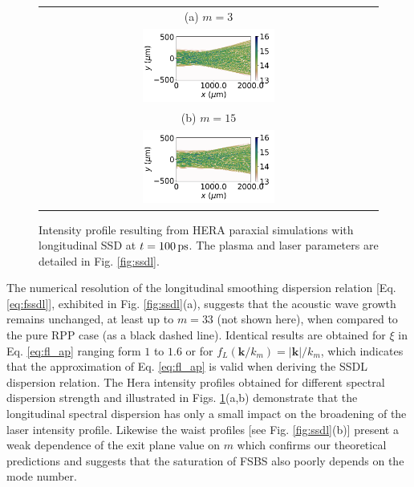 \documentclass[
 reprint,
 amsmath,amssymb,
 aps,
]{revtex4-1}
\begin{document}
\begin{figure}
\begin{tabular}{c}
(a)  $m=3$\\
\includegraphics[width=0.4\textwidth,trim={2cm 0 0 0},clip]{ISSD1.png}\\
(b) $m=15$\\
\includegraphics[width=0.4\textwidth,trim={2cm 0 0 0},clip]{ISSDL5.png}
\end{tabular}
\caption{ \label{fig:ssdl_I} 
  Intensity profile resulting from HERA  paraxial simulations  with longitudinal SSD at $t=100\,\rm ps$. The plasma and laser parameters are detailed in Fig. \ref{fig:ssdl}.
}
\end{figure}
The numerical resolution of the  longitudinal smoothing dispersion relation [Eq. \eqref{eq:fssdl}], exhibited in Fig. \ref{fig:ssdl}(a), suggests that the acoustic wave  growth remains unchanged, at least up to  $m=33$ (not shown here),  when compared to the pure RPP case (as a black dashed line). Identical results are obtained for $\xi$ in Eq. \eqref{eq:fl_ap} ranging form $1$ to $1.6$ or for  $f_L(\mathbf{k}/k_m) = \vert \mathbf{k}\vert /k_m$, which indicates that the approximation of Eq.  \eqref{eq:fl_ap} is valid  when deriving the SSDL dispersion relation.
The Hera intensity profiles obtained for different spectral dispersion strength and illustrated in Figs. \ref{fig:ssdl_I}(a,b) demonstrate that the longitudinal spectral dispersion has only a small impact on the broadening of the laser intensity profile.
Likewise the waist profiles [see Fig. \ref{fig:ssdl}(b)] present a weak  dependence of the exit plane value on $m$ which confirms our theoretical predictions and suggests that the saturation of FSBS also poorly depends on the mode number.
\end{document}

